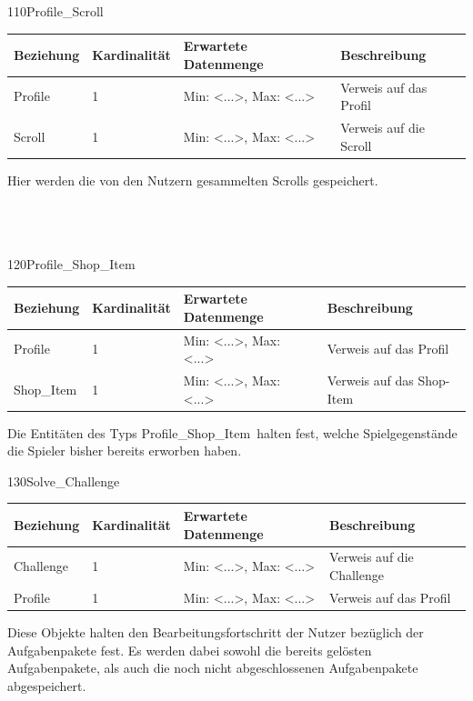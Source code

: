 \begin{entity}{110}{Profile\_Scroll}
\begin{center}
	\begin{longtable}{|m{4cm}|m{}|m{}|m{}|}
 	 \hline
 	 \textbf{Beziehung} & \textbf{Kardinalität} &  \textbf{Erwartete Datenmenge} & \textbf{Beschreibung} \\
  	\hline
	Profile & 1  & Min: <...>, Max: <...> & Verweis auf das Profil\\
	  \hline
  	Scroll & 1  & Min: <...>, Max: <...> & Verweis auf die Scroll\\
	  \hline
	\end{longtable}
\end{center}
Hier werden die von den Nutzern gesammelten Scrolls gespeichert.\\\\\\\
\end{entity}

\begin{entity}{120}{Profile\_Shop\_Item}
\begin{center}
	\begin{longtable}{|m{4cm}|m{}|m{}|m{}|}
 	 \hline
 	 \textbf{Beziehung} & \textbf{Kardinalität} &  \textbf{Erwartete Datenmenge} & \textbf{Beschreibung} \\
  	\hline
	Profile & 1  & Min: <...>, Max: <...> & Verweis auf das Profil\\
	  \hline
  	Shop\_Item & 1  & Min: <...>, Max: <...> & Verweis auf das Shop-Item\\
	  \hline
	\end{longtable}
\end{center}
Die Entitäten des Typs \glqq Profile\_Shop\_Item\grqq~halten fest, welche Spielgegenstände die Spieler bisher bereits erworben haben.
\end{entity}

\newpage
\begin{entity}{130}{Solve\_Challenge}
\begin{center}
	\begin{longtable}{|m{4cm}|m{}|m{}|m{}|}
 	 \hline
 	 \textbf{Beziehung} & \textbf{Kardinalität} &  \textbf{Erwartete Datenmenge} & \textbf{Beschreibung} \\
  	\hline
  	Challenge & 1  & Min: <...>, Max: <...> & Verweis auf die Challenge\\
	  \hline
	Profile & 1  & Min: <...>, Max: <...> & Verweis auf das Profil\\
	  \hline
	\end{longtable}
\end{center}
Diese Objekte halten den Bearbeitungsfortschritt der Nutzer bezüglich der Aufgabenpakete fest. Es werden dabei sowohl die bereits gelösten Aufgabenpakete, als auch die noch nicht abgeschlossenen Aufgabenpakete abgespeichert.\\\\\\\
\end{entity}

